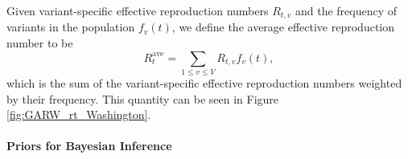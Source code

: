 \documentclass[11pt,oneside,letterpaper]{article}
\begin{document}
Given variant-specific effective reproduction numbers $R_{t,v}$ and the frequency of variants in the population $f_{v}(t)$, we define the average effective reproduction number to be
\begin{equation}
  R_{t}^{\text{ave}} = \sum_{1\leq v \leq V} R_{t,v}f_{v}(t),
\end{equation}
which is the sum of the variant-specific effective reproduction numbers weighted by their frequency. This quantity can be seen in Figure \ref{fig:GARW_rt_Washington}.




\paragraph{Priors for Bayesian Inference}%
\end{document}
